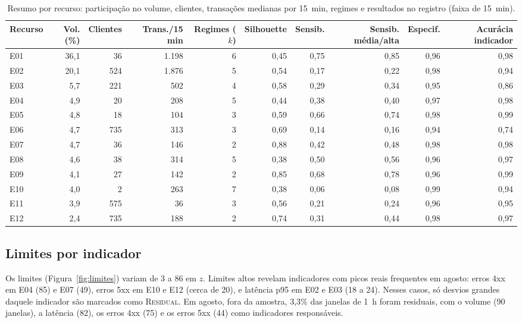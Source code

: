 \documentclass[sigconf,nonacm]{acmart}
\newcommand{\Residual}{\textsc{Residual}\xspace}
\begin{document}
\begin{table}[t]
  \caption{Resumo por recurso: participação no volume, clientes, transações medianas por 15~min, regimes e resultados no registro (faixa de 15~min).}
  \label{tab:recursos}
  \small
  \begin{tabular}{lrrrrrrrrr}
    \toprule
    Recurso & Vol. (\%) & Clientes & Trans./15 min & Regimes ($k$) & Silhouette & Sensib. & Sensib. média/alta & Especif. & Acurácia indicador \\
    \midrule
    E01 & 36,1 & 36  & 1.198 & 6 & 0,45 & 0,75 & 0,85 & 0,96 & 0,98 \\
    E02 & 20,1 & 524 & 1.876 & 5 & 0,54 & 0,17 & 0,22 & 0,98 & 0,94 \\
    E03 & 5,7  & 221 & 502   & 4 & 0,58 & 0,29 & 0,34 & 0,95 & 0,86 \\
    E04 & 4,9  & 20  & 208   & 5 & 0,44 & 0,38 & 0,40 & 0,97 & 0,98 \\
    E05 & 4,8  & 18  & 104   & 3 & 0,59 & 0,66 & 0,74 & 0,98 & 0,99 \\
    E06 & 4,7  & 735 & 313   & 3 & 0,69 & 0,14 & 0,16 & 0,94 & 0,74 \\
    E07 & 4,7  & 36  & 146   & 2 & 0,88 & 0,42 & 0,48 & 0,98 & 0,98 \\
    E08 & 4,6  & 38  & 314   & 5 & 0,38 & 0,50 & 0,56 & 0,96 & 0,97 \\
    E09 & 4,1  & 27  & 142   & 2 & 0,85 & 0,68 & 0,78 & 0,96 & 0,99 \\
    E10 & 4,0  & 2   & 263   & 7 & 0,38 & 0,06 & 0,08 & 0,99 & 0,94 \\
    E11 & 3,9  & 575 & 36    & 3 & 0,56 & 0,21 & 0,24 & 0,96 & 0,95 \\
    E12 & 2,4  & 735 & 188   & 2 & 0,74 & 0,31 & 0,44 & 0,98 & 0,97 \\
    \bottomrule
  \end{tabular}
\end{table}

\subsection{Limites por indicador}
Os limites (Figura~\ref{fig:limites}) variam de 3 a 86 em $z$. Limites altos revelam indicadores com picos reais frequentes em agosto: erros 4xx em E04 (85) e E07 (49), erros 5xx em E10 e E12 (cerca de 20), e latência p95 em E02 e E03 (18 a 24). Nesses casos, só desvios grandes daquele indicador são marcados como \Residual. Em agosto, fora da amostra, 3,3\% das janelas de 1~h foram residuais, com o volume (90 janelas), a latência (82), os erros 4xx (75) e os erros 5xx (44) como indicadores responsáveis.
\end{document}
